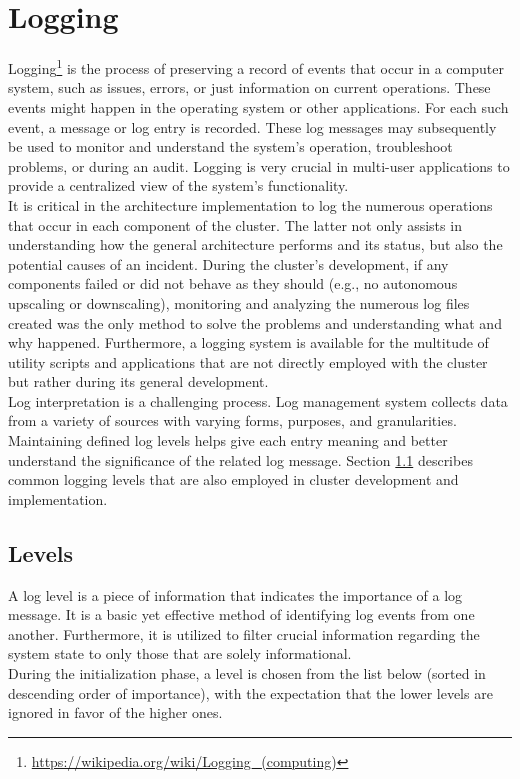 \chapter{Logging}
\label{cha:logging}

Logging\footnote{\url{https://wikipedia.org/wiki/Logging_(computing)}} is the process
of preserving a record of events that occur in a computer system, such as issues,
errors, or just information on current operations. These events might happen in the
operating system or other applications. For each such event, a message or log entry
is recorded. These log messages may subsequently be used to monitor and
understand the system's operation, troubleshoot problems, or during an audit. Logging
is very crucial in multi-user applications to provide a centralized view of the system's
functionality. \\ %
It is critical in the architecture implementation to log the numerous operations
that occur in each component of the cluster. The latter not only assists in
understanding how the general architecture performs and its status, but also the
potential causes of an incident. During the cluster's development, if any components
failed or did not behave as they should (e.g., no autonomous upscaling or
downscaling), monitoring and analyzing the numerous log files created was the
only method to solve the problems and understanding what and why happened. Furthermore,
a logging system is available for the multitude of utility scripts and
applications that are not directly employed with the cluster but rather during
its general development. \\ %
Log interpretation is a challenging process. Log management system collects data
from a variety of sources with varying forms, purposes, and granularities.
Maintaining defined log levels helps give each entry meaning and better
understand the significance of the related log message\cite{logging_levels}.
Section \ref{sec:logging_levels} describes common logging levels that are also
employed in cluster development and implementation.

\section{Levels}
\label{sec:logging_levels}

A log level is a piece of information that indicates the importance of a log message.
It is a basic yet effective method of identifying log events from one another. Furthermore,
it is utilized to filter crucial information regarding the system state to only
those that are solely informational\cite{logging_levels}. \\ %
During the initialization phase, a level is chosen from the list below (sorted in
descending order of importance), with the expectation that the lower levels are ignored
in favor of the higher ones.

